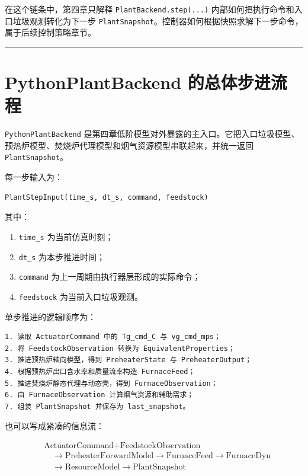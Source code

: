 \documentclass[UTF8,openany,zihao=-4,oneside]{ctexbook}
\providecommand{\passthrough}[1]{#1}
\newcommand{\manualdivider}{\par\vspace{0.6em}\noindent\textcolor{FGLine}{\rule{\linewidth}{0.7pt}}\vspace{0.6em}\par}
\begin{document}
在这个链条中，第四章只解释 \passthrough{\lstinline!PlantBackend.step(...)!} 内部如何把执行命令和入口垃圾观测转化为下一步 \passthrough{\lstinline!PlantSnapshot!}。控制器如何根据快照求解下一步命令，属于后续控制策略章节。

\manualdivider

\section{PythonPlantBackend 的总体步进流程}\label{pythonplantbackend-ux7684ux603bux4f53ux6b65ux8fdbux6d41ux7a0b}

\passthrough{\lstinline!PythonPlantBackend!} 是第四章低阶模型对外暴露的主入口。它把入口垃圾模型、预热炉模型、焚烧炉代理模型和烟气资源模型串联起来，并统一返回 \passthrough{\lstinline!PlantSnapshot!}。

每一步输入为：

\begin{lstlisting}
PlantStepInput(time_s, dt_s, command, feedstock)
\end{lstlisting}

其中：

\begin{enumerate}
\item \passthrough{\lstinline!time_s!} 为当前仿真时刻；
\item \passthrough{\lstinline!dt_s!} 为本步推进时间；
\item \passthrough{\lstinline!command!} 为上一周期由执行器层形成的实际命令；
\item \passthrough{\lstinline!feedstock!} 为当前入口垃圾观测。
\end{enumerate}

单步推进的逻辑顺序为：

\begin{lstlisting}
1. 读取 ActuatorCommand 中的 Tg_cmd_C 与 vg_cmd_mps；
2. 将 FeedstockObservation 转换为 EquivalentProperties；
3. 推进预热炉轴向模型，得到 PreheaterState 与 PreheaterOutput；
4. 根据预热炉出口含水率和质量流率构造 FurnaceFeed；
5. 推进焚烧炉静态代理与动态壳，得到 FurnaceObservation；
6. 由 FurnaceObservation 计算烟气资源和辅助需求；
7. 组装 PlantSnapshot 并保存为 last_snapshot。
\end{lstlisting}

也可以写成紧凑的信息流：

\[
\begin{aligned}
&\text{ActuatorCommand}+\text{FeedstockObservation}\\
&\quad\rightarrow \text{PreheaterForwardModel}
\rightarrow \text{FurnaceFeed}
\rightarrow \text{FurnaceDyn}\\
&\quad\rightarrow \text{ResourceModel}
\rightarrow \text{PlantSnapshot}
\end{aligned}
\]
\end{document}
